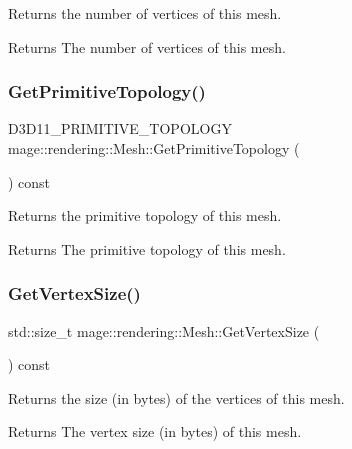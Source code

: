 Returns the number of vertices of this mesh.

\begin{DoxyReturn}{Returns}
The number of vertices of this mesh. 
\end{DoxyReturn}
\mbox{\label{classmage_1_1rendering_1_1_mesh_af6cead725f7e5352a90a8f8847580f75}} 
\subsubsection{\texorpdfstring{Get\+Primitive\+Topology()}{GetPrimitiveTopology()}}
{\footnotesize\ttfamily D3\+D11\+\_\+\+P\+R\+I\+M\+I\+T\+I\+V\+E\+\_\+\+T\+O\+P\+O\+L\+O\+GY mage\+::rendering\+::\+Mesh\+::\+Get\+Primitive\+Topology (\begin{DoxyParamCaption}{ }\end{DoxyParamCaption}) const\hspace{0.3cm}{\ttfamily [noexcept]}}

Returns the primitive topology of this mesh.

\begin{DoxyReturn}{Returns}
The primitive topology of this mesh. 
\end{DoxyReturn}
\mbox{\label{classmage_1_1rendering_1_1_mesh_a8bfbf41d64660994cc807884ef33c9a1}} 
\subsubsection{\texorpdfstring{Get\+Vertex\+Size()}{GetVertexSize()}}
{\footnotesize\ttfamily std\+::size\+\_\+t mage\+::rendering\+::\+Mesh\+::\+Get\+Vertex\+Size (\begin{DoxyParamCaption}{ }\end{DoxyParamCaption}) const\hspace{0.3cm}{\ttfamily [noexcept]}}

Returns the size (in bytes) of the vertices of this mesh.

\begin{DoxyReturn}{Returns}
The vertex size (in bytes) of this mesh. 
\end{DoxyReturn}
\mbox{\label{classmage_1_1rendering_1_1_mesh_a17f6dd40e8eea41b469b475de93ee466}} 
